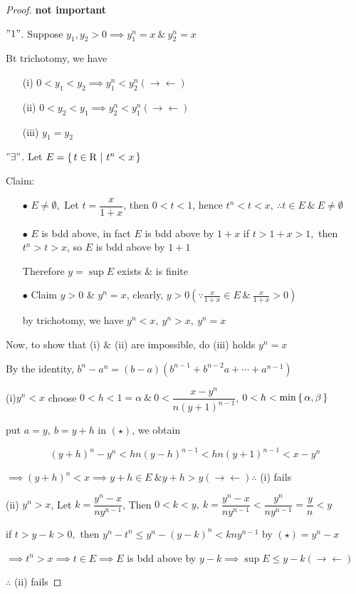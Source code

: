 \begin{proof}
	\textbf{\color{blue} not important}
	
	$"1"$. Suppose $y_1,y_2 > 0 \implies y_1^n = x ~\&~ y_2^n = x$
	
	Bt trichotomy,  we have 
	
	\begin{enumerate}
		\item[(i)]  $0<y_1<y_2 \implies y_1^n < y_2^n (\rightarrow\leftarrow)$
		\item[(ii)] $0 < y_2 < y_1 \implies y_2^n < y_1^n (\rightarrow\leftarrow)$
		\item[(iii)] $y_1 = y_2$
	\end{enumerate}
	
	$"\exists"$. Let $E = \left\{ \,t \in \mathrm{R}~|~t^n < x \,\right\}$
	
	Claim:
	
	\begin{enumerate}
		\item[$\bullet$] $E \neq \emptyset,$ Let $t = \dfrac{x}{1+x}$, then $0<t<1$, hence $t^n < t < x,~ \therefore t \in E ~\&~ E \neq \emptyset$
		\item[$\bullet$] $E$ is bdd above, in fact $E$ is bdd above by $1+x$ if $t>1+x>1,$ then $t^n > t>x$, so $E$ is bdd above by $1+1$
		
		Therefore $y = \sup E$ exists \& is finite
		\item[$\bullet$] Claim $y > 0$ \& $y^n = x$, clearly, $y>0(\because \frac{x}{1+x} \in E ~\&~\frac{x}{1+x}>0 )$
		
		by trichotomy, we have $y^n<x ,~y^n>x,~y^n=x$
	\end{enumerate}
	
	Now, to show that (i) \& (ii) are impossible, do (iii) holds $y^n = x$
	
	By the identity, $b^n - a^n = (b-a)(b^{n-1}+b^{n-2}a+\cdots+a^{n-1})$
	
	(i)$y^n < x$ choose $0 < h < 1 = \alpha ~\&  ~0 < \dfrac{x - y^n}{n(y+1)^{n-1}}$, $0<h<\min \left\{ \,\alpha,\beta \,\right\}$
	
	put $a = y,~ b = y+h$ in $(\star)$, we obtain
	
	$$(y+h)^n - y^n < hn(y-h)^{n-1} < hn(y+1)^{n-1} < x-y^n$$
	
	$\implies (y+h)^n < x \implies y+h \in E ~\& y+h > y (\rightarrow\leftarrow) \therefore$ (i) fails
	
	(ii) $y^n > x$, Let $k = \dfrac{y^n - x}{ny^{n-1}}$, Then $0<k<y,~ k = \dfrac{y^n - x}{ny^{n-1}} < \dfrac{y^n}{ny^{n-1}} = \dfrac{y}{n} < y$
	
	if $t > y-k > 0,$ then $y^n - t^n \leq y^n - (y-k)^n < kny^{n-1}$ by $(\star) = y^n - x$
	
	$\implies t^n > x \implies t \in E \implies E$ is bdd above by $y-k \implies \sup E \leq y-k (\rightarrow\leftarrow)$
	
	$\therefore$ (ii) fails
\end{proof}


